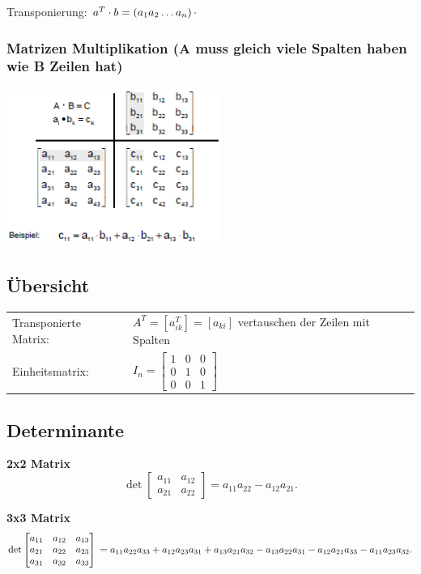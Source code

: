 			Transponierung: $a^T\cdot b= \left(a_1 \vspace{0.2cm} a_2\vspace{0.2cm}  \ldots a_n \right) 
			\cdot $
	
		\subsubsection{Matrizen Multiplikation \small{(A muss gleich viele Spalten
		haben wie B Zeilen hat)}}
		\includegraphics[width=7cm]{./bilder/matrizenmultiplikation.png}
    	
	
	
	
\subsection{Übersicht}
	\begin{tabular}{l l}
    	Transponierte Matrix: & $A^T=[a_{ik}^T]=[a_{ki}]$ vertauschen der Zeilen
    	mit Spalten\\
    	Einheitsmatrix:& $I_n= 
			    	\begin{bmatrix} 
			        	1&0 & 0\\
			        	0&1&0\\
			        	0&0&1                               
			        \end{bmatrix}$		    
    \end{tabular}

\subsection{Determinante}

	\textbf{2x2 Matrix}    
	$$ \det \begin{bmatrix} a_{11} & a_{12} \\ a_{21} & a_{22} \end{bmatrix} =
	a_{11} a_{22} - a_{12} a_{21}.  $$
	
	\textbf{3x3 Matrix}
	$$ \det \begin{bmatrix} a_{11} & a_{12} & a_{13} \\ a_{21} & a_{22}& a_{23} \\
	a_{31} & a_{32} & a_{33} \end{bmatrix} \\ = a_{11} a_{22} a_{33} + a_{12}
	a_{23} a_{31} + a_{13} a_{21} a_{32} - a_{13} a_{22} a_{31} - a_{12} a_{21}
	a_{33} - a_{11} a_{23} a_{32}.  $$
	
